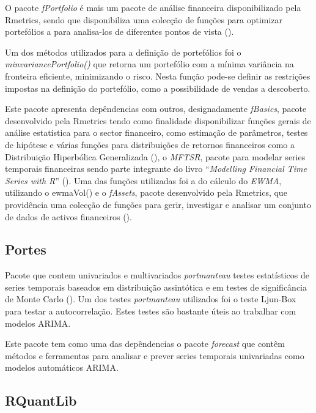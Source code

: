 \documentclass[
  12pt,
  a4paper,
  openany]{book}
\theoremstyle{definition}
\theoremstyle{definition}
\theoremstyle{definition}
\theoremstyle{remark}
\begin{document}
O pacote \emph{fPortfolio} é mais um pacote de análise financeira disponibilizado pela Rmetrics, sendo que disponibiliza uma colecção de funções para optimizar portefólios a para analisa-los de diferentes pontos de vista (\citet{fPortfolio}).

Um dos métodos utilizados para a definição de portefólios foi o \emph{minvariancePortfolio()} que retorna um portefólio com a mínima variância na fronteira eficiente, minimizando o risco. Nesta função pode-se definir as restrições impostas na definição do portefólio, como a possibilidade de vendas a descoberto.

Este pacote apresenta depêndencias com outros, designadamente \emph{fBasics}, pacote desenvolvido pela Rmetrics tendo como finalidade disponibilizar funções gerais de análise estatística para o sector financeiro, como estimação de parâmetros, testes de hipótese e várias funções para distribuições de retornos financeiros como a Distribuição Hiperbólica Generalizada (\citet{fBasics}), o \emph{MFTSR}, pacote para modelar series temporais financeiras sendo parte integrante do livro ``\emph{Modelling Financial Time Series with R}'' (\citet{MFTSR}). Uma das funções utilizadas foi a do cálculo do \emph{EWMA}, utilizando o ewmaVol() e o \emph{fAssets}, pacote desenvolvido pela Rmetrics, que providência uma colecção de funções para gerir, investigar e analisar um conjunto de dados de activos financeiros (\citet{fAssets}).

\hypertarget{portes}{%
\subsection{Portes}\label{portes}}

Pacote que contem univariados e multivariados \emph{portmanteau} testes estatísticos de series temporais baseados em distribuição assintótica e em testes de significância de Monte Carlo (\citet{portes}). Um dos testes \emph{portmanteau} utilizados foi o teste Ljun-Box para testar a autocorrelação. Estes testes são bastante úteis ao trabalhar com modelos ARIMA.

Este pacote tem como uma das depêndencias o pacote \emph{forecast} que contêm métodos e ferramentas para analisar e prever series temporais univariadas como modelos automáticos ARIMA.

\hypertarget{rquantlib}{%
\subsection{RQuantLib}\label{rquantlib}}
\end{document}
